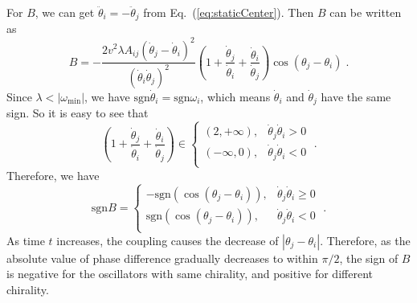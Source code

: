 \documentclass[%
 aip,
 amsmath,amssymb,
 reprint,%
]{revtex4-1}
\begin{document}
For $B$, we can get $\ddot{\theta}_i=-\ddot{\theta}_j$ from Eq.~(\ref{eq:staticCenter}). Then $B$ can be written as
\begin{equation}
    B=-\frac{2v^2\lambda A_{ij}\left( \dot{\theta}_j-\dot{\theta}_i \right) ^2}{\left( \dot{\theta}_i\dot{\theta}_j \right) ^2}\left( 1+\frac{\dot{\theta}_j}{\dot{\theta}_i}+\frac{\dot{\theta}_i}{\dot{\theta}_j} \right) \cos \left( \theta _j-\theta _i \right)\;.
\end{equation}
Since $\lambda<|\omega_{\min}|$, we have $\text{sgn}\dot{\theta}_i=\text{sgn}\omega_i$, which means $\dot{\theta}_i$ and $\dot{\theta}_j$ have the same sign. So it is easy to see that
\begin{equation}
    \left( 1+\frac{\dot{\theta}_j}{\dot{\theta}_i}+\frac{\dot{\theta}_i}{\dot{\theta}_j} \right) \in \begin{cases}
        \left( 2,+\infty \right) ,&		\dot{\theta}_j\dot{\theta}_i>0\\
        \left( -\infty , 0 \right) ,&		\dot{\theta}_j\dot{\theta}_i<0\\
    \end{cases}\;.
\end{equation}
Therefore, we have
\begin{equation}
    \text{sgn} B =\begin{cases}
        -\text{sgn} \left( \cos \left( \theta _j-\theta _i \right) \right) ,&		\dot{\theta}_j\dot{\theta}_i\geqslant 0\\
        \text{sgn} \left( \cos \left( \theta _j-\theta _i \right) \right) ,&		\dot{\theta}_j\dot{\theta}_i<0\\
    \end{cases}\;.
\end{equation}
As time $t$ increases, the coupling causes the decrease of $\left| \theta _j-\theta _i \right|$. Therefore, as the absolute value of phase difference gradually decreases to within $\pi/2$, the sign of $B$ is negative for the oscillators with same chirality, and positive for different chirality.
\end{document}
